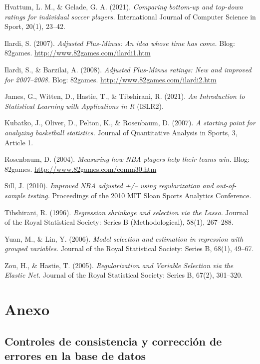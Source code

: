 \documentclass[
  12pt,
]{article}
\begin{document}
Hvattum, L. M., \& Gelade, G. A. (2021). \emph{Comparing bottom-up and
top-down ratings for individual soccer players.} International Journal
of Computer Science in Sport, 20(1), 23--42.

Ilardi, S. (2007). \emph{Adjusted Plus-Minus: An idea whose time has
come.} Blog: 82games. \url{http://www.82games.com/ilardi1.htm}

Ilardi, S., \& Barzilai, A. (2008). \emph{Adjusted Plus-Minus ratings:
New and improved for 2007--2008.} Blog: 82games.
\url{http://www.82games.com/ilardi2.htm}

James, G., Witten, D., Hastie, T., \& Tibshirani, R. (2021). \emph{An
Introduction to Statistical Learning with Applications in R} (ISLR2).

Kubatko, J., Oliver, D., Pelton, K., \& Rosenbaum, D. (2007). \emph{A
starting point for analyzing basketball statistics.} Journal of
Quantitative Analysis in Sports, 3, Article 1.

Rosenbaum, D. (2004). \emph{Measuring how NBA players help their teams
win.} Blog: 82games. \url{http://www.82games.com/comm30.htm}

Sill, J. (2010). \emph{Improved NBA adjusted +/-- using regularization
and out-of-sample testing.} Proceedings of the 2010 MIT Sloan Sports
Analytics Conference.

Tibshirani, R. (1996). \emph{Regression shrinkage and selection via the
Lasso.} Journal of the Royal Statistical Society: Series B
(Methodological), 58(1), 267--288.

Yuan, M., \& Lin, Y. (2006). \emph{Model selection and estimation in
regression with grouped variables.} Journal of the Royal Statistical
Society: Series B, 68(1), 49--67.

Zou, H., \& Hastie, T. (2005). \emph{Regularization and Variable
Selection via the Elastic Net.} Journal of the Royal Statistical
Society: Series B, 67(2), 301--320.

\newpage

\section{Anexo}\label{anexo}

\subsection{Controles de consistencia y corrección de errores en la base
de
datos}\label{controles-de-consistencia-y-correcciuxf3n-de-errores-en-la-base-de-datos}
\end{document}
